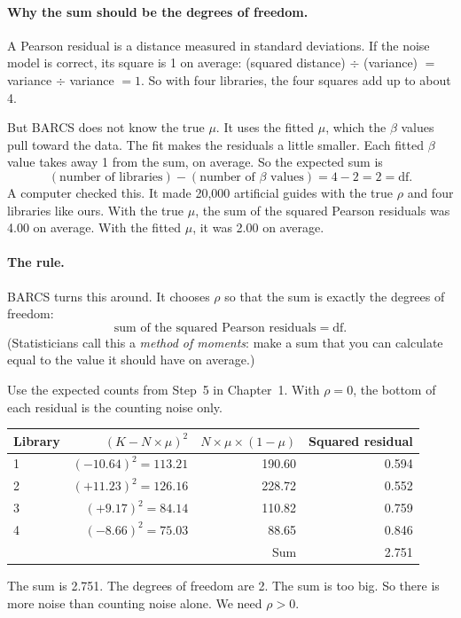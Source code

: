 \paragraph{Why the sum should be the degrees of freedom.} A Pearson
residual is a distance measured in standard deviations. If the noise model
is correct, its square is 1 on average: (squared distance) $\div$ (variance)
$= $ variance $\div$ variance $= 1$. So with four libraries, the four
squares add up to about 4.

But BARCS does not know the true $\mu$. It uses the fitted $\mu$, which the
$\beta$ values pull toward the data. The fit makes the residuals a little
smaller. Each fitted $\beta$ value takes away 1 from the sum, on average. So
the expected sum is
\[
(\text{number of libraries}) - (\text{number of } \beta \text{ values})
 = 4 - 2 = 2 = \text{df}.
\]
A computer checked this. It made 20{,}000 artificial guides with the true
$\rho$ and four libraries like ours. With the true $\mu$, the sum of the
squared Pearson residuals was 4.00 on average. With the fitted $\mu$, it was
2.00 on average.

\paragraph{The rule.} BARCS turns this around. It chooses $\rho$ so that the
sum is exactly the degrees of freedom:
\[
\text{sum of the squared Pearson residuals} = \text{df}.
\]
(Statisticians call this a \emph{method of moments}: make a sum that you can
calculate equal to the value it should have on average.)

\begin{worked}[ 11: start with \texorpdfstring{$\rho = 0$}{rho = 0}]
Use the expected counts from Step~5 in Chapter~1. With $\rho = 0$, the bottom of each
residual is the counting noise only.

\begin{tabular}{@{}lrrr@{}}
\toprule
Library & $(K - N \times \mu)^2$ & $N \times \mu \times (1-\mu)$ & Squared residual\\
\midrule
1 & $(-10.64)^2 = 113.21$ & 190.60 & 0.594\\
2 & $(+11.23)^2 = 126.16$ & 228.72 & 0.552\\
3 & $(+9.17)^2 = 84.14$   & 110.82 & 0.759\\
4 & $(-8.66)^2 = 75.03$   &  88.65 & 0.846\\
\midrule
  &  & Sum & 2.751\\
\bottomrule
\end{tabular}

\smallskip
The sum is 2.751. The degrees of freedom are 2. The sum is too big. So
there is more noise than counting noise alone. We need $\rho > 0$.
\end{worked}

